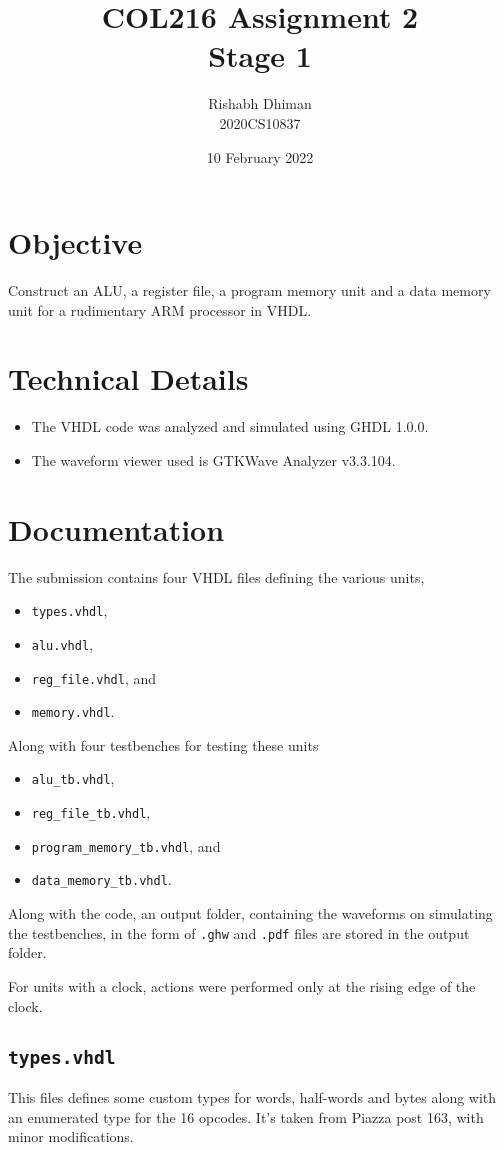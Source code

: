 \documentclass[a4paper]{scrartcl}
\title{COL216 Assignment 2\\{\Large Stage 1}}
\date{10 February 2022}
\author{Rishabh Dhiman\\ 2020CS10837}
\renewcommand{\tt}{\texttt}
\begin{document}
\maketitle

\section{Objective}
Construct an ALU, a register file, a program memory unit and a data memory unit for a rudimentary ARM processor in VHDL.

\section{Technical Details}
\begin{itemize}
	\item The VHDL code was analyzed and simulated using GHDL 1.0.0.
	\item The waveform viewer used is GTKWave Analyzer v3.3.104.
\end{itemize}

\section{Documentation}
The submission contains four VHDL files defining the various units,
\begin{itemize}
	\item \tt{types.vhdl},
	\item \tt{alu.vhdl},
	\item \tt{reg_file.vhdl}, and
	\item \tt{memory.vhdl}.
\end{itemize}
Along with four testbenches for testing these units
\begin{itemize}
	\item \tt{alu_tb.vhdl},
	\item \tt{reg_file_tb.vhdl},
	\item \tt{program_memory_tb.vhdl}, and
	\item \tt{data_memory_tb.vhdl}.
\end{itemize}

Along with the code, an output folder, containing the waveforms on simulating the testbenches, in the form of \tt{.ghw} and \tt{.pdf} files are stored in the output folder.

For units with a clock, actions were performed only at the rising edge of the clock.

\subsection*{\tt{types.vhdl}}
This files defines some custom types for words, half-words and bytes along with an enumerated type for the 16 opcodes. It's taken from Piazza post 163, with minor modifications.
\end{document}
